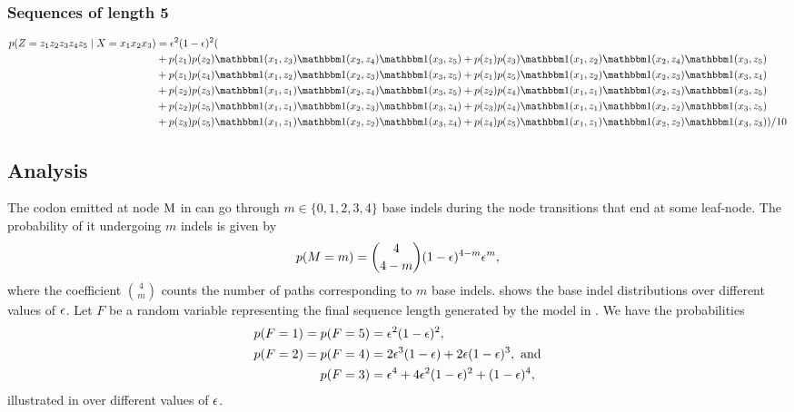 \subsubsection{Sequences of length 5}

\begin{equation*}
  \begin{split}
    p(Z=z_1z_2z_3z_4z_5 \gv X=x_1x_2x_3)
        &= \e^2(1-\e)^2(\\
        &+p(z_1)p(z_2)\I(x_1, z_3)\I(x_2, z_4)\I(x_3, z_5)+p(z_1)p(z_3)\I(x_1, z_2)\I(x_2, z_4)\I(x_3, z_5)\\
        &+p(z_1)p(z_4)\I(x_1, z_2)\I(x_2, z_3)\I(x_3, z_5)+p(z_1)p(z_5)\I(x_1, z_2)\I(x_2, z_3)\I(x_3, z_4)\\
        &+p(z_2)p(z_3)\I(x_1, z_1)\I(x_2, z_4)\I(x_3, z_5)+p(z_2)p(z_4)\I(x_1, z_1)\I(x_2, z_3)\I(x_3, z_5)\\
        &+p(z_2)p(z_5)\I(x_1, z_1)\I(x_2, z_3)\I(x_3, z_4)+p(z_3)p(z_4)\I(x_1, z_1)\I(x_2, z_2)\I(x_3, z_5)\\
        &+p(z_3)p(z_5)\I(x_1, z_1)\I(x_2, z_2)\I(x_3, z_4)+p(z_4)p(z_5)\I(x_1, z_1)\I(x_2, z_2)\I(x_3, z_3))/10
  \end{split}
\end{equation*}

\subsection{Analysis}

The codon emitted at node $\mathrm{M}$ in  can go through $m\in\{0, 1, 2, 3,
4\}$ base indels during the node transitions that end at some leaf-node. The probability of
it undergoing $m$ indels is given by
\begin{equation*}
  p(M=m) = \binom{4}{4-m} (1 - \epsilon)^{4-m} \epsilon^m,
\end{equation*}
where the coefficient $\binom{4}{m}$ counts the number of paths corresponding to $m$ base indels.
 shows the base indel distributions over different values of $\epsilon$.
Let $F$ be a random variable representing the final sequence length generated by the model in
.
We have the probabilities
\begin{equation*}
  \begin{split}
    p(F=1) = p(F=5) &= \epsilon^2(1-\epsilon)^2, \\
    p(F=2) = p(F=4) &= 2\epsilon^3(1-\epsilon) + 2\epsilon(1-\epsilon)^3,~\text{and} \\
    p(F=3)          &= \epsilon^4 + 4\epsilon^2(1-\epsilon)^2 + (1-\epsilon)^4,
  \end{split}
\end{equation*}
illustrated in  over different values of $\epsilon$.

